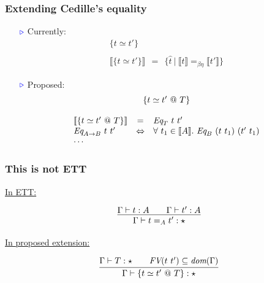 \documentclass[11pt]{beamer}
\newcommand{\interp}[1]{\llbracket #1 \rrbracket}
\newcommand{\myb}[0]{\ensuremath{\textcolor{blue}{\triangleright}}}
\begin{document}
\begin{frame}
  \frametitle{Extending Cedille's equality}

  \begin{itemize}
    \item[$\myb$]
  Currently:
  \[
  \begin{array}{c}
    \{ t \simeq t'\} \\ \\
    \interp{\{ t \simeq t'\}} \ \ = \ \ \{ \hat{t}\ |\ \interp{t} =_{\beta\eta} \interp{t'} \}
    \end{array}
  \]

    \item[$\myb$]
  Proposed:
  \[
  \begin{array}{lcl}
    \multicolumn{3}{c}{\{ t \simeq t'\ @\ T\}} \\ \\
    \interp{\{ t \simeq t'\ @\ T\}} & = & \textit{Eq}_{T}\ t\ t' \\
    \textit{Eq}_{A\to B}\ t\ t' & \Leftrightarrow & \forall\ t_1\in\interp{A}.\ \textit{Eq}_{B}\ (t\ t_1)\ (t'\ t_1)\\
    \multicolumn{3}{l}{\cdots}
    \end{array}
    \]


\vspace{.5cm}

      \large\color{purple}

    
    \end{itemize}

\end{frame}

\begin{frame}
  \frametitle{This is not ETT}

  \underline{In ETT:}

  \[
  \infer{\Gamma\vdash t =_A t' : \star}{\Gamma\vdash t : A \qquad \Gamma\vdash t' : A}
  \]

\vspace{1cm}

  \underline{In proposed extension:}
  
  \[
  \infer{\Gamma\vdash \{ t \simeq t'\ @\ T \} : \star}{\Gamma\vdash T: \star \qquad \textit{FV}(t\ t')\subseteq\textit{dom}(\Gamma)}
  \]

  \end{frame}
\end{document}
